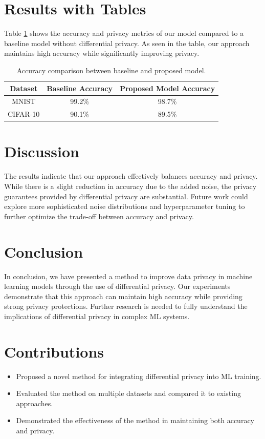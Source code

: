 \documentclass{article}
\begin{document}
\section{Results with Tables}
Table \ref{tab:results} shows the accuracy and privacy metrics of our model compared to a baseline model without differential privacy. As seen in the table, our approach maintains high accuracy while significantly improving privacy.

\begin{table}[ht]
\centering
\begin{tabular}{|c|c|c|}
\hline
Dataset & Baseline Accuracy & Proposed Model Accuracy \\
\hline
MNIST & 99.2\% & 98.7\% \\
CIFAR-10 & 90.1\% & 89.5\% \\
\hline
\end{tabular}
\caption{Accuracy comparison between baseline and proposed model.}
\label{tab:results}
\end{table}

\section{Discussion}
The results indicate that our approach effectively balances accuracy and privacy. While there is a slight reduction in accuracy due to the added noise, the privacy guarantees provided by differential privacy are substantial. Future work could explore more sophisticated noise distributions and hyperparameter tuning to further optimize the trade-off between accuracy and privacy.

\section{Conclusion}
In conclusion, we have presented a method to improve data privacy in machine learning models through the use of differential privacy. Our experiments demonstrate that this approach can maintain high accuracy while providing strong privacy protections. Further research is needed to fully understand the implications of differential privacy in complex ML systems.

\section{Contributions}
\begin{itemize}
    \item Proposed a novel method for integrating differential privacy into ML training.
    \item Evaluated the method on multiple datasets and compared it to existing approaches.
    \item Demonstrated the effectiveness of the method in maintaining both accuracy and privacy.
\end{itemize}



\end{document}
